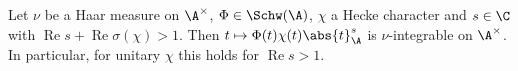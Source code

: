Let $\nu$ be a Haar measure on $\A^\times$, $\Phi\in\Schw(\A)$, $\chi$ a Hecke character and $s\in\C$ with
$\operatorname{Re}s+\operatorname{Re}\sigma(\chi)>1$. Then $t\mapsto\Phi(t)\chi(t)\abs{t}_\A^s$ is $\nu$-integrable on
$\A^\times$. In particular, for unitary $\chi$ this holds for $\operatorname{Re}s>1$.
